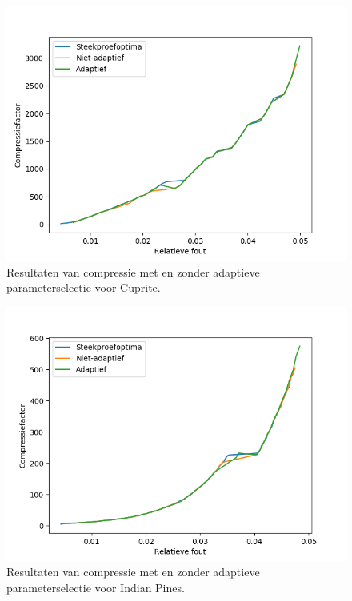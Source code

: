 \begin{figure}[H]
  \centering
  \includegraphics[scale=0.7]{images/parameter_functions_results_including_adaptive_Cuprite_tensor_trains.png}
  \caption{Resultaten van compressie met en zonder adaptieve parameterselectie voor Cuprite.}
  \label{fig:parameter_functions_results_including_adaptive_Cuprite_tensor_trains}
\end{figure}

\newpage
\begin{figure}[H]
  \centering
  \includegraphics[scale=0.7]{images/parameter_functions_results_including_adaptive_Indian_Pines_tensor_trains.png}
  \caption{Resultaten van compressie met en zonder adaptieve parameterselectie voor Indian Pines.}
  \label{fig:parameter_functions_results_including_adaptive_Indian_Pines_tensor_trains}
\end{figure}
